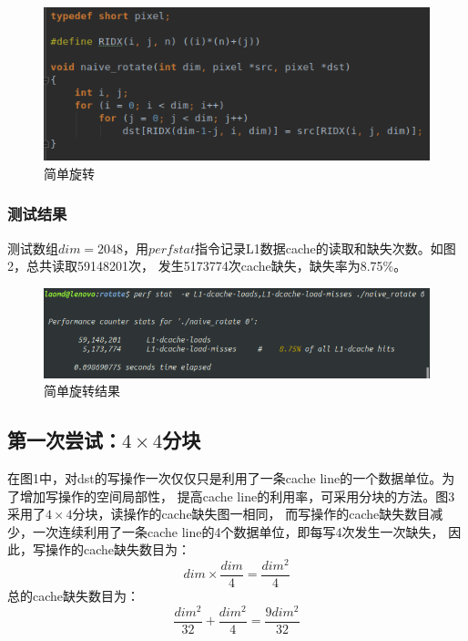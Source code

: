 \documentclass[12pt]{article}
\begin{document}
\begin{figure}[h]
\begin{center}
\includegraphics[width=\textwidth]{c0.png} %
\caption{简单旋转}
\end{center}
\end{figure}

\subsubsection{测试结果}
测试数组$dim=2048$，用$perf stat$指令记录L1数据cache的读取和缺失次数。如图2，总共读取59148201次，
发生5173774次cache缺失，缺失率为8.75\%。
\begin{figure}[h]
\begin{center}
\includegraphics[width=\textwidth]{p0.png} %
\caption{简单旋转结果}
\end{center}
\end{figure}

\newpage
\subsection{第一次尝试：$4 \times 4$分块}
在图1中，对dst的写操作一次仅仅只是利用了一条cache line的一个数据单位。为了增加写操作的空间局部性，
提高cache line的利用率，可采用分块的方法。图3采用了$4 \times 4$分块，读操作的cache缺失图一相同，
而写操作的cache缺失数目减少，一次连续利用了一条cache line的4个数据单位，即每写4次发生一次缺失，
因此，写操作的cache缺失数目为：
\begin{equation}
  dim \times \frac{dim}{4} = \frac{dim^2}{4}
\end{equation}
总的cache缺失数目为：
\begin{equation}
  \frac{dim^2}{32} + \frac{dim^2}{4} = \frac{9dim^2}{32}
\end{equation}
\end{document}

